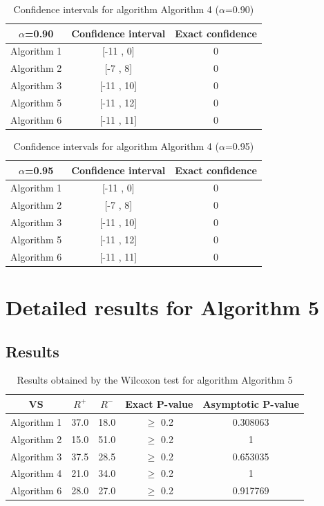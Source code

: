 \documentclass[a4paper,10pt]{article}
\begin{document}
\begin{table}[!htp]
\centering\small
\begin{tabular}{
|c|c|c|}
\hline
 $\alpha$=0.90 & Confidence interval & Exact confidence \\ \hline 
Algorithm 1 & [-11 , 0] & 0\\ \hline 
Algorithm 2 & [-7 , 8] & 0\\ \hline 
Algorithm 3 & [-11 , 10] & 0\\ \hline 
Algorithm 5 & [-11 , 12] & 0\\ \hline 
Algorithm 6 & [-11 , 11] & 0\\ \hline 

\end{tabular}
\caption{Confidence intervals for algorithm Algorithm 4 ($\alpha$=0.90)}
\end{table}
\begin{table}[!htp]
\centering\small
\begin{tabular}{
|c|c|c|}
\hline
 $\alpha$=0.95 & Confidence interval & Exact confidence \\ \hline 
Algorithm 1 & [-11 , 0] & 0\\ \hline 
Algorithm 2 & [-7 , 8] & 0\\ \hline 
Algorithm 3 & [-11 , 10] & 0\\ \hline 
Algorithm 5 & [-11 , 12] & 0\\ \hline 
Algorithm 6 & [-11 , 11] & 0\\ \hline 

\end{tabular}
\caption{Confidence intervals for algorithm Algorithm 4 ($\alpha$=0.95)}
\end{table}

 \clearpage 


\section{Detailed results for Algorithm 5}


\subsection{Results}

\begin{table}[!htp]
\centering\small
\begin{tabular}{
|c|c|c|c|c|}
\hline
 VS & $R^{+}$ & $R^{-}$ & Exact P-value & Asymptotic P-value \\ \hline 
Algorithm 1 & 37.0 & 18.0 & $\geq$ 0.2 & 0.308063\\ \hline 
Algorithm 2 & 15.0 & 51.0 & $\geq$ 0.2 & 1\\ \hline 
Algorithm 3 & 37.5 & 28.5 & $\geq$ 0.2 & 0.653035\\ \hline 
Algorithm 4 & 21.0 & 34.0 & $\geq$ 0.2 & 1\\ \hline 
Algorithm 6 & 28.0 & 27.0 & $\geq$ 0.2 & 0.917769\\ \hline 

\end{tabular}
\caption{Results obtained by the Wilcoxon test for algorithm Algorithm 5}
\end{table}
\end{document}
